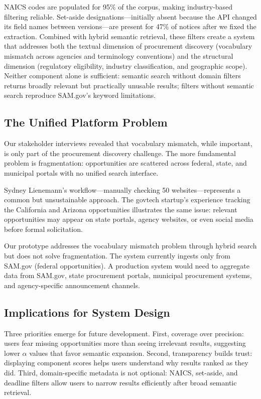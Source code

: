 \documentclass[10pt,twocolumn]{article}
\begin{document}
NAICS codes are populated for 95\% of the corpus, making industry-based filtering reliable. Set-aside designations---initially absent because the API changed its field names between versions---are present for 47\% of notices after we fixed the extraction. Combined with hybrid semantic retrieval, these filters create a system that addresses both the textual dimension of procurement discovery (vocabulary mismatch across agencies and terminology conventions) and the structural dimension (regulatory eligibility, industry classification, and geographic scope). Neither component alone is sufficient: semantic search without domain filters returns broadly relevant but practically unusable results; filters without semantic search reproduce SAM.gov's keyword limitations.

\subsection{The Unified Platform Problem}

Our stakeholder interviews revealed that vocabulary mismatch, while important, is only part of the procurement discovery challenge. The more fundamental problem is fragmentation: opportunities are scattered across federal, state, and municipal portals with no unified search interface.

Sydney Lienemann's workflow---manually checking 50 websites---represents a common but unsustainable approach. The govtech startup's experience tracking the California and Arizona opportunities illustrates the same issue: relevant opportunities may appear on state portals, agency websites, or even social media before formal solicitation.

Our prototype addresses the vocabulary mismatch problem through hybrid search but does not solve fragmentation. The system currently ingests only from SAM.gov (federal opportunities). A production system would need to aggregate data from SAM.gov, state procurement portals, municipal procurement systems, and agency-specific announcement channels.

\subsection{Implications for System Design}

Three priorities emerge for future development. First, coverage over precision: users fear missing opportunities more than seeing irrelevant results, suggesting lower $\alpha$ values that favor semantic expansion. Second, transparency builds trust: displaying component scores helps users understand why results ranked as they did. Third, domain-specific metadata is not optional: NAICS, set-aside, and deadline filters allow users to narrow results efficiently after broad semantic retrieval.
\end{document}
